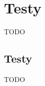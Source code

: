 \documentclass[praca_magisterska]{subfiles}
\begin{document}
\chapter{Testy}
\label{chapter:testy}

TODO

\section{Testy}

TODO
\end{document}
